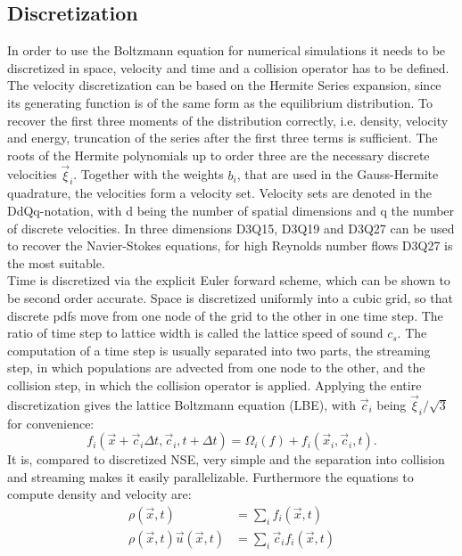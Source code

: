 \subsection{Discretization}
In order to use the Boltzmann equation for numerical simulations it needs to be discretized in space, velocity and time and a collision operator has to be defined. The velocity discretization can be based on the Hermite Series expansion, since its generating function is of the same form as the equilibrium distribution. To recover the first three moments of the distribution correctly, i.e. density, velocity and energy, truncation of the series after the first three terms is sufficient. The roots of the Hermite polynomials up to order three are the necessary discrete velocities $\vec{\xi}_i$. Together with the weights $b_i$, that are used in the Gauss-Hermite quadrature, the velocities form a velocity set. Velocity sets are denoted in the DdQq-notation, with d being the number of spatial dimensions and q the number of discrete velocities. In three dimensions D3Q15, D3Q19 and D3Q27 can be used to recover the Navier-Stokes equations, for high Reynolds number flows D3Q27 is the most suitable\cite{kang_effect_2013}. \cite[p. 73-93]{kruger_lattice_2017} \\
Time is discretized via the explicit Euler forward scheme, which can be shown to be second order accurate. Space is discretized uniformly into a cubic grid, so that discrete pdfs move from one node of the grid to the other in one time step. The ratio of time step to lattice width is called the lattice speed of sound $c_s$. The computation of a time step is usually separated into two parts, the streaming step, in which populations are advected from one node to the other, and the collision step, in which the collision operator is applied. Applying the entire discretization gives the lattice Boltzmann equation (LBE), with $\vec{c}_i$ being $\vec{\xi}_i/\sqrt{3}$ for convenience:
\begin{equation}
	f_i(\vec{x} + \vec{c}_i \Delta t, \vec{c}_i, t+\Delta t ) = \Omega_i(f) + f_i(\vec{x}_i, \vec{c}_i, t). \label{eq:LBE}
\end{equation}
 It is, compared to discretized NSE, very simple and the separation into collision and streaming makes it easily parallelizable. Furthermore the equations to compute density and velocity are: \cite[p. 94-98]{kruger_lattice_2017}
\begin{align}
	\rho(\vec{x}, t) &= \sum_i f_i(\vec{x}, t) \label{eq:density_d} \\
	\rho(\vec{x}, t) \vec{u}(\vec{x}, t) &= \sum_i \vec{c}_i f_i(\vec{x}, t) \label{eq:vel_d}
\end{align}
